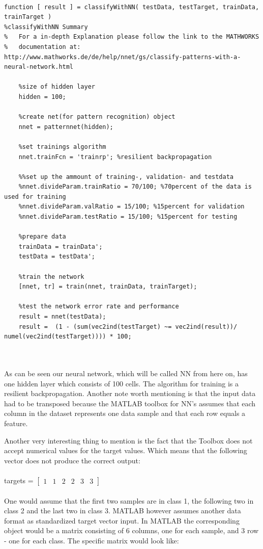 \documentclass[subfigure,epsfig,fleqn,float,ausarbeitung]{scrartcl}
\begin{document}
\begin{lstlisting}

function [ result ] = classifyWithNN( testData, testTarget, trainData, trainTarget )
%classifyWithNN Summary
%   For a in-depth Explanation please follow the link to the MATHWORKS 
%   documentation at: http://www.mathworks.de/de/help/nnet/gs/classify-patterns-with-a-neural-network.html

	%size of hidden layer
	hidden = 100;
      
	%create net(for pattern recognition) object
	nnet = patternnet(hidden);
      
	%set trainings algorithm
	nnet.trainFcn = 'trainrp'; %resilient backpropagation
      
	%%set up the ammount of training-, validation- and testdata
	%nnet.divideParam.trainRatio = 70/100; %70percent of the data is used for training
	%nnet.divideParam.valRatio = 15/100; %15percent for validation
	%nnet.divideParam.testRatio = 15/100; %15percent for testing
      
	%prepare data
	trainData = trainData';
	testData = testData';
      
	%train the network
	[nnet, tr] = train(nnet, trainData, trainTarget);
      
	%test the network error rate and performance
	result = nnet(testData);
	result =  (1 - (sum(vec2ind(testTarget) ~= vec2ind(result))/ numel(vec2ind(testTarget)))) * 100;

\end{lstlisting}
~\\ ~\\
As can be seen our neural network, which will be called NN from here on, has one hidden layer which consists of 100 cells. The algorithm for training is a resilient backpropagation. Another note worth mentioning is that the input data had to be transposed because the MATLAB toolbox for NN’s assumes that each column in the dataset represents one data sample and that each row equals a feature.

Another very interesting thing to mention is the fact that the Toolbox does not accept numerical values for the target values. Which means that the following vector does not produce the correct output:
~\\ ~\\
targets = $\begin{bmatrix}
1 & 1 & 2 & 2 & 3 & 3
\end{bmatrix}$
~\\ ~\\
One would assume that the first two samples are in class 1, the following two in class 2 and the last two in class 3. MATLAB however assumes another data format as standardized target vector input. In MATLAB the corresponding object would be a matrix consisting of 6 columns, one for each sample, and 3 row - one for each class. The specific matrix would look like:
\end{document}
